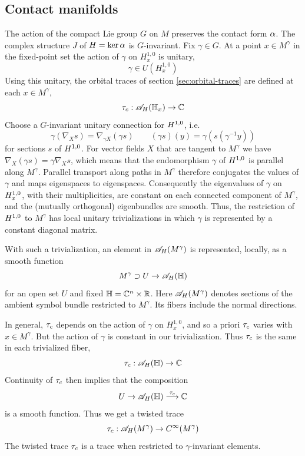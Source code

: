 \documentclass[11pt]{amsart}
\theoremstyle{plain}
\theoremstyle{definition}
\theoremstyle{remark}
\begin{document}
\subsection{Contact manifolds}\label{sec:orbital traces on M}

The action of the compact Lie group $G$ on $M$ preserves the contact form $\alpha$.
The complex structure $J$ of $H=\ker \alpha$ is $G$-invariant.
Fix $\gamma\in G$.
At a point $x\in M^\gamma$ in the fixed-point set
the action of $\gamma$ on $H^{1,0}_x$ is unitary,
\[ \gamma\in U(H^{1,0}_x)\]
Using this unitary, the orbital traces of section \ref{sec:orbital-traces}
are defined at each $x\in M^\gamma$,
\[\tau_{c}:{\mathscr{A}}_H(\mathbb{H}_x)\to {\mathbb{C}}\]
Choose a $G$-invariant unitary connection for $H^{1,0}$, i.e.
\[\gamma(\nabla_X s)=\nabla_{\gamma X}(\gamma s)\qquad (\gamma s)(y)=\gamma( s(\gamma^{-1}y))\]
for sections $s$ of $H^{1,0}$.
For vector fields $X$ that are tangent to $M^\gamma$ we have $\nabla_X(\gamma s)=\gamma\nabla_X s$,
which means that the endomorphism $\gamma$ of $H^{1,0}$ is parallel along $M^\gamma$.
Parallel transport along paths in $M^\gamma$ therefore conjugates the values of $\gamma$ and maps eigenspaces to eigenspaces.
Consequently the eigenvalues of $\gamma$ on $H^{1,0}_x$, with their multiplicities, are constant on each connected component of $M^\gamma$, and the (mutually orthogonal) eigenbundles are smooth.
Thus, the restriction of $H^{1,0}$ to $M^\gamma$ has local unitary trivializations in which $\gamma$ is represented by a constant diagonal matrix.



With such a trivialization, an element in ${\mathscr{A}}_H(M^\gamma)$ is represented, locally, as a smooth function
\[ M^\gamma\supset U\to {\mathscr{A}}_H(\mathbb{H})\]
for an open set $U$ and
fixed $\mathbb{H}={\mathbb{C}}^n\times {\mathbb{R}}$.
Here ${\mathscr{A}}_H(M^\gamma)$ denotes sections of the ambient symbol bundle restricted to $M^\gamma$. Its fibers include the normal directions.

In general, $\tau_{c}$ depends on the action of $\gamma$ on $H^{1,0}_x$, and so a priori $\tau_{c}$ varies with $x\in M^\gamma$.
But the action of $\gamma$ is constant in our trivialization. Thus $\tau_{c}$ is the same in each trivialized fiber,
\[ \tau_{c}:{\mathscr{A}}_H(\mathbb{H})\to {\mathbb{C}}\]
Continuity of $\tau_{c}$ then implies that the composition
\[ U\to {\mathscr{A}}_H(\mathbb{H})\stackrel{\tau_{c}}{\longrightarrow} {\mathbb{C}}\]
is a smooth function.
Thus we get a twisted trace
\[ \tau_{c}:{\mathscr{A}}_H(M^\gamma)\to C^\infty(M^\gamma)\]
The twisted trace $\tau_{c}$ is a trace when restricted to $\gamma$-invariant elements.
\end{document}

